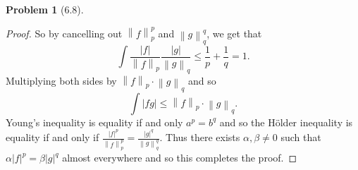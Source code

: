 \documentclass[12pt]{article}
\newcommand{\norm}[1]{\left\lVert #1 \right\rVert}
\theoremstyle{definition}
\newtheorem{problem}{Problem}
\begin{document}
\begin{problem}[6.8]
\begin{enumerate}[label = (\alph{*})]
\begin{proof}
                So by cancelling out \( \norm{f}^p_p \) and \( \norm{g}^q_q \), we get that
                    \[
                        \int \frac{|f|}{\norm{f}_p} \frac{|g|}{\norm{g}_q} \leq \frac{1}{p} + \frac{1}{q} = 1.
                    \]
                Multiplying both sides by \( \norm{f}_p \cdot \norm{g}_q \) and so
                    \[
                        \int |fg| \leq \norm{f}_p \cdot \norm{g}_q.
                    \]
                Young's inequality is equality if and only \( a^p = b^q \) and so the H\"{o}lder inequality is equality if and only if \( \displaystyle \frac{|f|^p}{\norm{f}^p_p} =  \frac{|g|^q}{\norm{g}_q^q} \). 
                Thus there exists \( \alpha, \beta \neq 0 \) such that \( \alpha |f|^p = \beta |g|^q \) almost everywhere and so this completes the proof.
            \end{proof}
    \end{enumerate}
    
\end{problem}
\end{document}
